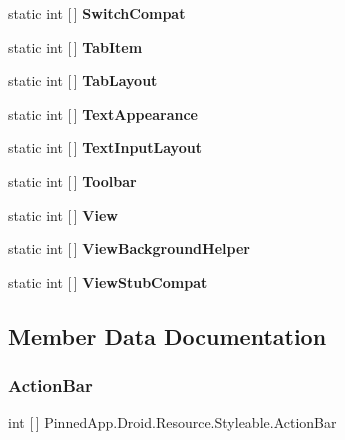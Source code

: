 \begin{DoxyCompactItemize}
static int \mbox{[}$\,$\mbox{]} {\bfseries Switch\+Compat}
\item 
static int \mbox{[}$\,$\mbox{]} {\bfseries Tab\+Item}
\item 
static int \mbox{[}$\,$\mbox{]} {\bfseries Tab\+Layout}
\item 
static int \mbox{[}$\,$\mbox{]} {\bfseries Text\+Appearance}
\item 
static int \mbox{[}$\,$\mbox{]} {\bfseries Text\+Input\+Layout}
\item 
static int \mbox{[}$\,$\mbox{]} {\bfseries Toolbar}
\item 
static int \mbox{[}$\,$\mbox{]} {\bfseries View}
\item 
static int \mbox{[}$\,$\mbox{]} {\bfseries View\+Background\+Helper}
\item 
static int \mbox{[}$\,$\mbox{]} {\bfseries View\+Stub\+Compat}
\end{DoxyCompactItemize}


\subsection{Member Data Documentation}
\mbox{\label{class_pinned_app_1_1_droid_1_1_resource_1_1_styleable_a2dfa039b9266eef472da8a69c502395d}} 
\subsubsection{\texorpdfstring{Action\+Bar}{ActionBar}}
{\footnotesize\ttfamily int \mbox{[}$\,$\mbox{]} Pinned\+App.\+Droid.\+Resource.\+Styleable.\+Action\+Bar\hspace{0.3cm}{\ttfamily [static]}}

